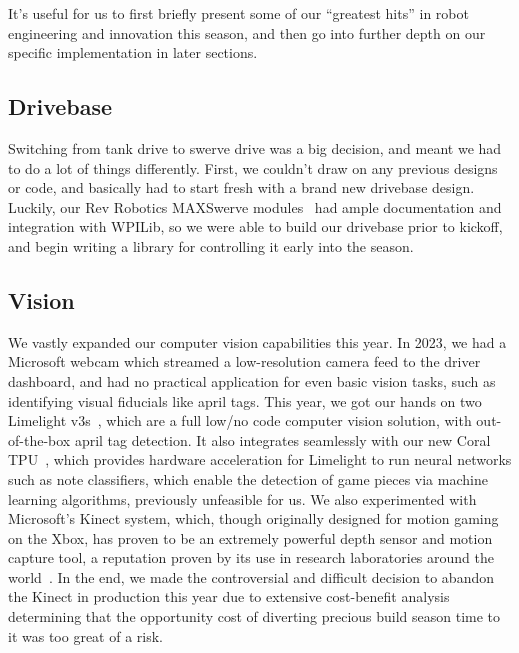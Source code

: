 It's useful for us to first briefly present some of our ``greatest
hits'' in robot engineering and innovation this season, and then go into
further depth on our specific implementation in later sections.

\subsection{Drivebase}

Switching from tank drive to swerve drive was a big decision, and meant
we had to do a lot of things differently. First, we couldn't draw on any
previous designs or code, and basically had to start fresh with a brand
new drivebase design. Luckily, our Rev Robotics MAXSwerve
modules~\cite{revswervemodule} had ample documentation and integration
with WPILib, so we were able to build our drivebase prior to kickoff,
and begin writing a library for controlling it early into the season.



\subsection{Vision}

We vastly expanded our computer vision capabilities this year. In
2023, we had a Microsoft webcam which streamed a low-resolution camera
feed to the driver dashboard, and had no practical application for even
basic vision tasks, such as identifying visual fiducials like april
tags. This year, we got our hands on two Limelight v3s~\cite{limelight},
which are a full low/no code computer vision solution, with
out-of-the-box april tag detection. It also integrates seamlessly with
our new Coral TPU~\cite{coral}, which provides hardware acceleration for
Limelight to run neural networks such as note classifiers, which enable
the detection of game pieces via machine learning algorithms, previously
unfeasible for us. We also experimented with Microsoft's Kinect system,
which, though originally designed for motion gaming on the Xbox, has
proven to be an extremely powerful depth sensor and motion capture tool,
a reputation proven by its use in research laboratories around the
world~\cite{kinectpaper}. In the end, we made the controversial and
difficult decision to abandon the Kinect in production this year due to
extensive cost-benefit analysis determining that the opportunity cost of
diverting precious build season time to it was too great of a risk.\@


